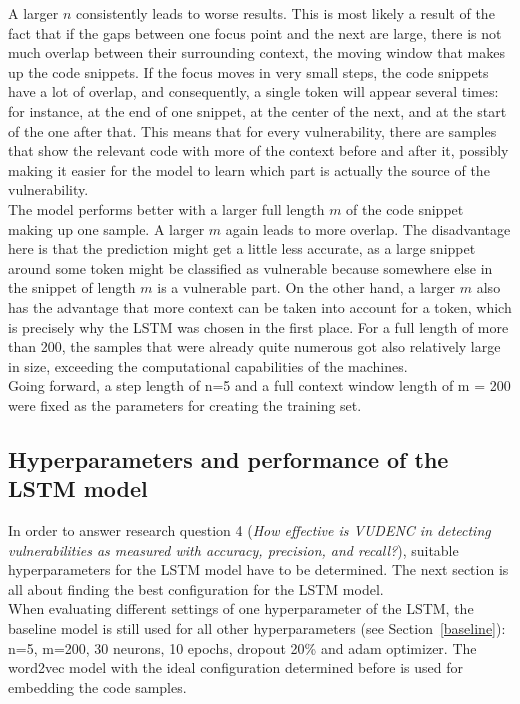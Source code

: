 \documentclass[
a4paper,
pagesize,
pdftex,
12pt,
twoside, %
BCOR=5mm, %
ngerman,
fleqn,
final,
]{scrartcl}
\begin{document}
	A larger $n$ consistently leads to worse results. This is most likely a result of the fact that if the gaps between one focus point and the next are large, there is not much overlap between their surrounding context, the moving window that makes up the code snippets. If the focus moves in very small steps, the code snippets have a lot of overlap, and consequently, a single token will appear several times: for instance, at the end of one snippet, at the center of the next, and at the start of the one after that. This means that for every vulnerability, there are samples that show the relevant code with more of the context before and after it, possibly making it easier for the model to learn which part is actually the source of the vulnerability.\\
	The model performs better with a larger full length $m$ of the code snippet making up one sample. A larger $m$ again leads to more overlap. The disadvantage here is that the prediction might get a little less accurate, as a large snippet around some token might be classified as vulnerable because somewhere else in the snippet of length $m$ is a vulnerable part. On the other hand, a larger $m$ also has the advantage that more context can be taken into account for a token, which is precisely why the LSTM was chosen in the first place. For a full length of more than 200, the samples that were already quite numerous got also relatively large in size, exceeding the computational capabilities of the machines. \\
	Going forward, a step length of n=5 and a full context window length of m = 200 were fixed as the parameters for creating the training set.
	
	\subsection{Hyperparameters and performance of the LSTM model}
	
	In order to answer research question 4 (\textit{How effective is VUDENC in detecting vulnerabilities as measured with accuracy, precision, and recall?}), suitable hyperparameters for the LSTM model have to be determined. The next section is all about finding the best configuration for the LSTM model. \\	
	When evaluating different settings of one hyperparameter of the LSTM, the baseline model is still used for all other hyperparameters (see Section~\ref{baseline}): n=5, m=200, 30 neurons, 10 epochs, dropout 20\% and adam optimizer. The word2vec model with the ideal configuration determined before is used for embedding the code samples.
\end{document}
